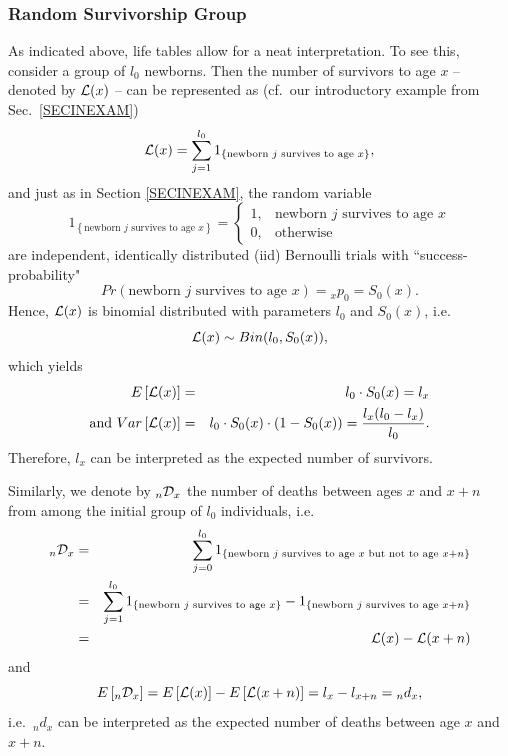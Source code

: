 \documentclass[11pt,fleqn,oneside]{book}
\begin{document}
\normalsize


\subsubsection*{Random Survivorship Group}

As indicated above, life tables allow for a neat interpretation. To see this, consider a group of $l_0$ newborns. Then the number of survivors to age $x$ -- denoted by ${\cal L}(x)$ -- can be represented as (cf.\ our introductory example from Sec.\ \ref{SECINEXAM})
$$
{\cal L}(x) = \sum_{j=1}^{l_0} 1_{\left\{\text{newborn } j \text{ survives to age } x\right\}},
$$
and just as in Section \ref{SECINEXAM}, the random variable
$$
1_{\left\{\text{newborn } j \text{ survives to age } x\right\}} = \left\{
\begin{array}{ll}
	1, & \text{newborn } j \text{ survives to age } x \\
	0, & \text{otherwise}
\end{array}
\right.
$$
are independent, identically distributed (iid) Bernoulli trials with ``success-probability"
$$
Pr\left(\text{newborn } j \text{ survives to age } x\right) = {_xp_0} = S_0(x).
$$
Hence, ${\cal L}(x)$ is binomial distributed with parameters $l_0$ and $S_0(x)$, i.e.\
$$
{\cal L}(x) \sim Bin(l_0,S_0(x)),
$$
which yields
\begin{eqnarray*}
E\left[{\cal L}(x)\right] &=& l_0 \cdot S_0(x) = l_x\\
\text{and } Var\left[{\cal L}(x)\right] &=& l_0 \cdot S_0(x) \cdot (1-S_0(x))= \frac{l_x(l_0-l_x)}{l_0}.
\end{eqnarray*}
Therefore, $l_x$ can be interpreted as the expected number of survivors.

Similarly, we denote by $_n{\cal D}_x$ the number of deaths between ages $x$ and $x+n$ from among the initial group of $l_0$ individuals, i.e.
\begin{eqnarray*}
{_n{\cal D}_x} &=& \sum_{j=0}^{l_0} 1_{\left\{\text{newborn } j \text{ survives to age } x \text{ but not to age } x+n \right\}} \\
&=& \sum_{j=1}^{l_0} 1_{\left\{\text{newborn } j \text{ survives to age } x \right\}} - 1_{\left\{\text{newborn } j \text{ survives to age } x+n \right\}} \\
&=& {\cal L}(x) - {\cal L}(x+n)
\end{eqnarray*}
and
$$
E\left[{_n{\cal D}_x}\right] = E\left[{\cal L}(x)\right] - E\left[{\cal L}(x+n)\right]
=l_x - l_{x+n} = {_nd_x},
$$
i.e.\ ${_nd_x}$ can be interpreted as the expected number of deaths between age $x$ and $x+n$.
\end{document}
